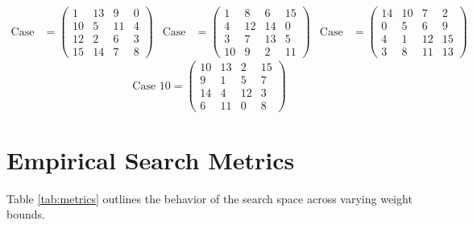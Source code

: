 \documentclass[11pt,a4paper]{article}
\begin{document}
{\begin{align*}
\text{Case 7} &= \begin{pmatrix} 1 & 13 & 9 & 0 \\ 10 & 5 & 11 & 4 \\ 12 & 2 & 6 & 3 \\ 15 & 14 & 7 & 8 \end{pmatrix} &
\text{Case 8} &= \begin{pmatrix} 1 & 8 & 6 & 15 \\ 4 & 12 & 14 & 0 \\ 3 & 7 & 13 & 5 \\ 10 & 9 & 2 & 11 \end{pmatrix} &
\text{Case 9} &= \begin{pmatrix} 14 & 10 & 7 & 2 \\ 0 & 5 & 6 & 9 \\ 4 & 1 & 12 & 15 \\ 3 & 8 & 11 & 13 \end{pmatrix}
\end{align*}
\begin{equation*}
\text{Case 10} = \begin{pmatrix} 10 & 13 & 2 & 15 \\ 9 & 1 & 5 & 7 \\ 14 & 4 & 12 & 3 \\ 6 & 11 & 0 & 8 \end{pmatrix}
\end{equation*}
}
\section{Empirical Search Metrics}
Table \ref{tab:metrics} outlines the behavior of the search space across varying weight bounds.
\end{document}
